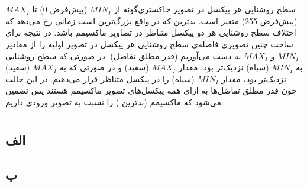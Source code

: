 \documentclass{article}
\begin{document}
\section{}%
سطح روشنایی هر پیکسل در تصویر خاکستری‌گونه از $MIN_{I}$ (پیش‌فرض 0) تا $MAX_{I}$ (پیش‌فرض 255) متغیر است. بدترین  که در واقع بزرگ‌ترین  است زمانی رخ می‌دهد که اختلاف سطح روشنایی هر دو پیکسل متناظر در تصاویر ماکسیمم باشد. در نتیجه برای ساخت چنین تصویری فاصله‌ی سطح روشنایی هر پیکسل در تصویر اولیه را از مقادیر $MIN_{I}$ و $MAX_{I}$ به دست می‌آوریم (قدر مطلق تفاضل). در صورتی که سطح روشنایی به $MIN_{I}$ (سیاه) نزدیک‌تر بود، مقدار $MAX_{I}$ (سفید) و در صورتی که به $MAX_{I}$ (سفید) نزدیک‌تر بود، مقدار $MIN_{I}$ (سیاه) را در پیکسل متناظر قرار می‌دهیم. در این حالت چون قدر مطلق تفاضل‌ها به ازای همه پیکسل‌های تصویر ماکسیمم هستند پس تضمین می‌شود که ماکسیمم (بدترین ) را نسبت به تصویر ورودی داریم.





\section{}%
\subsection{الف}
\subsubsection{}
\begin{latin}

\end{latin}
\subsubsection{}
\begin{latin}

\end{latin}

\subsection{ب}
\subsubsection{}
\begin{latin}

\end{latin}
\subsubsection{}
\begin{latin}

\end{latin}
\end{document}
